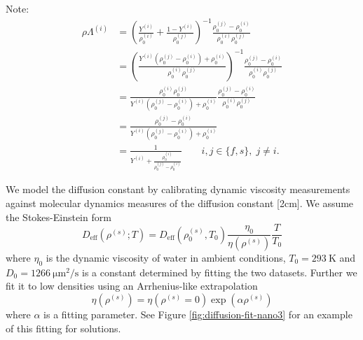 \documentclass[12pt,twoside]{report}
\begin{document}
Note:
\begin{equation}
  \begin{aligned}
    \rho \Lambda^{(i)} &=
    \left(
    \frac{Y^{(i)}}{\rho^{(i)}_0} +
    \frac{1 - Y^{(i)}}{\rho^{(j)}_0}
    \right)^{-1}
    \frac{\rho^{(j)}_0 - \rho^{(i)}_0}{\rho^{(i)}_0\rho^{(j)}_0} \\
    &=
    \left(
    \frac{Y^{(i)} (\rho^{(j)}_0 - \rho^{(i)}_0) + \rho^{(i)}_0}{\rho^{(i)}_0 \rho^{(j)}_0}
    \right)^{-1}
    \frac{\rho^{(j)}_0 - \rho^{(i)}_0}{\rho^{(i)}_0\rho^{(j)}_0}
    \\
    &=
    \frac{\rho^{(i)}_0 \rho^{(j)}_0}{Y^{(i)} (\rho^{(j)}_0 - \rho^{(i)}_0) + \rho^{(i)}_0}
    \frac{\rho^{(j)}_0 - \rho^{(i)}_0}{\rho^{(i)}_0\rho^{(j)}_0}
    \\
    &=
    \frac{\rho^{(j)}_0 - \rho^{(i)}_0}{Y^{(i)} (\rho^{(j)}_0 - \rho^{(i)}_0) + \rho^{(i)}_0}
    \\
    &=
    \frac{1}{Y^{(i)} + \frac{\rho^{(i)}_0}{\rho^{(j)}_0 - \rho^{(i)}_0}}
    \qquad i,j \in \{f,s\}, \; j \ne i.
  \end{aligned}
\end{equation}

We model the diffusion constant by calibrating dynamic viscosity measurements
 against molecular dynamics measures of the diffusion constant [2cm].
We assume the Stokes-Einstein form
\begin{equation}
  D_{\textrm{eff}}(\rho^{(s)};T) = D_{\textrm{eff}}(\rho_0^{(s)}, T_0) \frac{\eta_0}{\eta(\rho^{(s)})} \frac{T}{T_0}
\end{equation}
where $\eta_0$ is the dynamic viscosity of water in ambient conditions, $T_0 = \SI{293}{\kelvin}$ and $D_0 = \SI{1266}{\micro\metre^2\per\second}$ is a constant determined by fitting the two datasets.
Further we fit it to low densities using an Arrhenius-like extrapolation
\begin{equation}
  \eta(\rho^{(s)}) = \eta(\rho^{(s)} = 0) \exp{\left( \alpha \rho^{(s)} \right)}
\end{equation}
where $\alpha$ is a fitting parameter.
See Figure \ref{fig:diffusion-fit-nano3} for an example of this fitting for  solutions.
\end{document}
